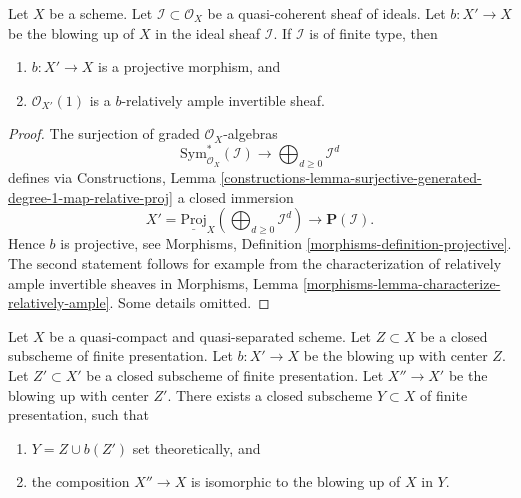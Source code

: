 \begin{lemma}
\label{lemma-blowing-up-projective}
Let $X$ be a scheme. Let $\mathcal{I} \subset \mathcal{O}_X$ be a
quasi-coherent sheaf of ideals. Let $b : X' \to X$ be the blowing up of $X$
in the ideal sheaf $\mathcal{I}$. If $\mathcal{I}$ is of finite type, then
\begin{enumerate}
\item $b : X' \to X$ is a projective morphism, and
\item $\mathcal{O}_{X'}(1)$ is a $b$-relatively ample invertible sheaf.
\end{enumerate}
\end{lemma}

\begin{proof}
The surjection of graded $\mathcal{O}_X$-algebras
$$
\text{Sym}_{\mathcal{O}_X}^*(\mathcal{I})
\longrightarrow
\bigoplus\nolimits_{d \geq 0} \mathcal{I}^d
$$
defines via Constructions, Lemma
\ref{constructions-lemma-surjective-generated-degree-1-map-relative-proj}
a closed immersion
$$
X' = \underline{\text{Proj}}_X (\bigoplus\nolimits_{d \geq 0} \mathcal{I}^d)
\longrightarrow
\mathbf{P}(\mathcal{I}).
$$
Hence $b$ is projective, see
Morphisms, Definition \ref{morphisms-definition-projective}.
The second statement follows for example from the characterization
of relatively ample invertible sheaves in
Morphisms, Lemma \ref{morphisms-lemma-characterize-relatively-ample}.
Some details omitted.
\end{proof}

\begin{lemma}
\label{lemma-composition-finite-type-blowups}
Let $X$ be a quasi-compact and quasi-separated scheme.
Let $Z \subset X$ be a closed subscheme of finite presentation.
Let $b : X' \to X$ be the blowing up with center $Z$. Let $Z' \subset X'$ be
a closed subscheme of finite presentation.
Let $X'' \to X'$ be the blowing up with center $Z'$.
There exists a closed subscheme $Y \subset X$ of finite presentation,
such that
\begin{enumerate}
\item $Y = Z \cup b(Z')$ set theoretically, and
\item the composition $X'' \to X$ is isomorphic to the blowing up
of $X$ in $Y$.
\end{enumerate}
\end{lemma}

